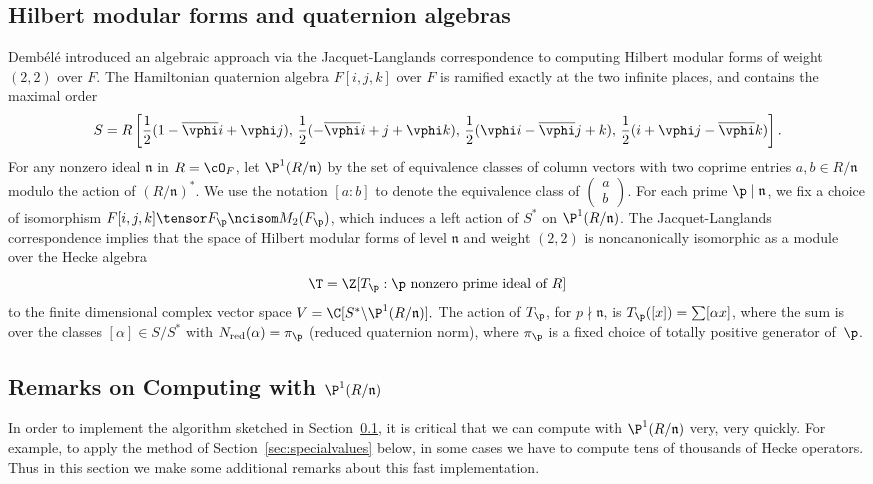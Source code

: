 \documentclass{amsart}
\newcommand{\n}{\mathfrak{n}}
\newcommand{\dembele}{Demb\'el{\'e}\xspace}
\begin{document}
\subsection{Hilbert modular forms and quaternion 
algebras}\label{sec:dembele}
\dembele \cite{dembele:hilbert5} introduced an algebraic approach via
the Jacquet-Langlands correspondence to computing Hilbert modular
forms of weight $(2,2)$ over $F$.  The Hamiltonian quaternion algebra
$F[i,j,k]$ over $F$ is ramified exactly at the two infinite places,
and contains the maximal order
$$
 S = R\left[\frac{1}{2}(1-\overline{\vphi} i + \vphi j),\,
       \frac{1}{2}(-\overline{\vphi} i + j + \vphi k),\,
       \frac{1}{2}(\vphi i - \overline{\vphi} j + k), \,
       \frac{1}{2}(i + \vphi j - \overline{\vphi} k)\right].
$$
For any nonzero ideal $\n$ in $R=\cO_F$,
let $\P^1(R/\n)$ by the set of equivalence classes of
 column vectors with two coprime entries $a,b \in R/\n$ modulo the
 action of $(R/\n)^*$.  We use the notation $[a:b]$
to denote the equivalence class of 
$\left(\begin{smallmatrix}a\\b\end{smallmatrix}\right)$.
For each prime $\p\mid \n$, we fix a choice of isomorphism
$F[i,j,k]\tensor F_{\p} \ncisom M_2(F_{\p})$, which induces a left
action of $S^*$ on $\P^1(R/\n)$. The Jacquet-Langlands correspondence implies that
the space of Hilbert modular forms of level $\n$ and weight $(2,2)$ is
noncanonically isomorphic as a module over the Hecke algebra
$$\T=\Z[T_\p :  \p \text{ nonzero prime ideal of }R]$$ 
to the finite dimensional complex vector space $ V = \C[S^* \backslash
\P^1(R/\n)].  $ The action of $T_{\p}$, for $p\nmid \n$, is
$T_{\p}([x]) = \sum [\alpha x]$, where the sum is over the classes
$[\alpha]\in S/S^*$ with $N_{\text{red}}(\alpha)=\pi_{\p}$ (reduced quaternion norm),
where $\pi_{\p}$ is a fixed choice of totally positive generator of~$\p$.

\subsection{Remarks on Computing with $\P^1(R/\n)$}\label{sec:p1rn}

In order to implement the algorithm sketched in
Section~\ref{sec:dembele}, it is critical that we can compute with
$\P^1(R/\n)$ very, very quickly.  For example, to apply the method of
Section~\ref{sec:specialvalues} below, in some cases we have to
compute tens of thousands of Hecke operators.  Thus in this section we
make some additional remarks about this fast
implementation.
\end{document}
